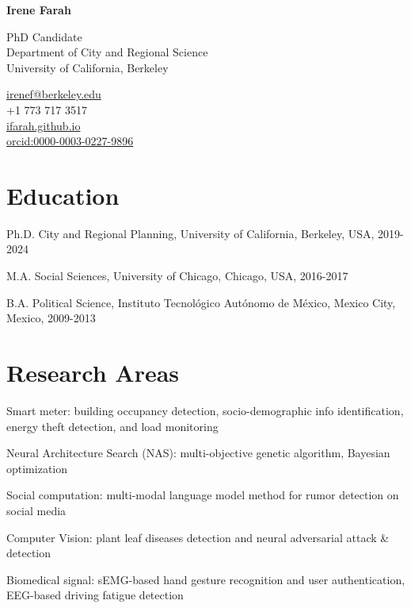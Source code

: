 \documentclass[12pt,letterpaper]{report}
\newcommand{\myname}{Irene Farah}
\newcommand{\namefont}[1]{{\normalfont\bfseries\Huge{#1}}}
\newcommand{\listitemspace}{0.25em}
\renewenvironment{itemize}
{\begin{list}{}{\setlength{\leftmargin}{0em}
                \setlength{\parskip}{0em}
                \setlength{\itemsep}{\listitemspace}
                \setlength{\parsep}{\listitemspace}}}
{\end{list}}
\begin{document}
    \raggedright{}

    \namefont{\myname}

    \vspace{1em}
    \begin{minipage}[t]{0.700\textwidth}
        PhD Candidate \\
        Department of City and Regional Science \\
        University of California, Berkeley
    \end{minipage}
    \begin{minipage}[t]{0.295\textwidth}
        \flushright{}
        \href{mailto:irenef@berkeley.edu}{irenef@berkeley.edu} \\
        +1 773 717 3517 \\
        \href{https://ifarah.github.io}{ifarah.github.io}\\
        \href{https://orcid.org/0000-0003-0227-9896}{orcid:0000-0003-0227-9896}
    \end{minipage}

    \section*{Education}
    
    \begin{tablist}
      \item[Ph.D.] \tab{}City and Regional Planning, University of California, Berkeley, USA, 2019-2024
      \item[M.A.] \tab{}Social Sciences, University of Chicago, Chicago, USA, 2016-2017
      \item[B.A.] \tab{}Political Science, Instituto Tecnológico Autónomo de México, Mexico City, Mexico, 2009-2013
    \end{tablist}
    
    \section*{Research Areas}
    \begin{itemize}
      \item Smart meter: building occupancy detection, socio-demographic info identification, energy theft detection, and load monitoring
      \item Neural Architecture Search (NAS): multi-objective genetic algorithm, Bayesian optimization
      \item Social computation: multi-modal language model method for rumor detection on social media
      \item Computer Vision: plant leaf diseases detection and neural adversarial attack \& detection
      \item Biomedical signal: sEMG-based hand gesture recognition and user authentication, EEG-based driving fatigue detection
    \end{itemize}
    
\end{document}
